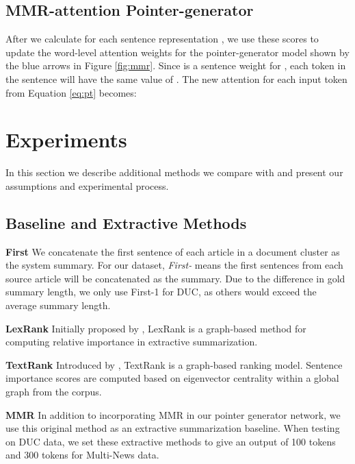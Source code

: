 \documentclass[11pt,a4paper]{article}
\begin{document}
\subsection{MMR-attention Pointer-generator}

After we calculate  for each sentence representation , we use these scores to update the word-level attention weights for the pointer-generator model shown by the blue arrows in Figure \ref{fig:mmr}. Since  is a sentence weight for , each token in the sentence will have the same value of . The new attention for each input token from Equation \ref{eq:pt} becomes: 



\section{Experiments}
In this section we describe additional methods we compare with and present our assumptions and experimental process.













\subsection{Baseline and Extractive Methods}
\textbf{First} We concatenate the first sentence of each article in a document cluster as the system summary. For our dataset, \textit{First-} means the first  sentences from each source article will be concatenated as the summary. Due to the difference in gold summary length, we only use First-1 for DUC, as others would exceed the average summary length.

\noindent\textbf{LexRank} Initially proposed by \cite{erkan2004lexrank}, LexRank is a graph-based method for computing relative importance in extractive summarization.

\noindent\textbf{TextRank} Introduced by \cite{mihalcea2004textrank}, TextRank is a graph-based ranking model.  Sentence importance scores are computed based on eigenvector centrality within a global graph from the corpus.


\noindent\textbf{MMR} In addition to incorporating MMR in our pointer generator network, we use this original method as an extractive summarization baseline.
When testing on DUC data, we set these extractive methods to give an output of 100 tokens and 300 tokens for Multi-News data.
\end{document}
